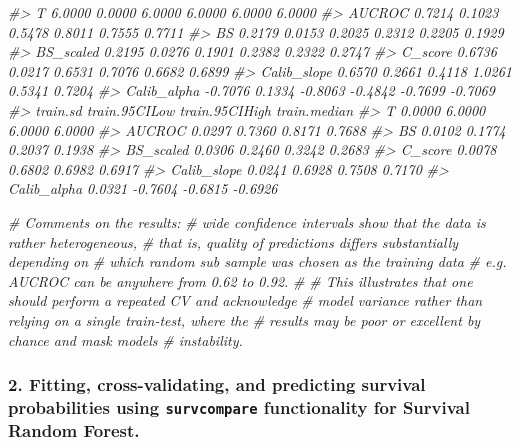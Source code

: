 \documentclass[
]{article}
\newenvironment{Shaded}{\begin{snugshade}}{\end{snugshade}}
\newcommand{\CommentTok}[1]{\textcolor[rgb]{0.56,0.35,0.01}{\textit{#1}}}
\begin{document}
\begin{Shaded}
\begin{Highlighting}[]
\CommentTok{\#\textgreater{} T              6.0000  0.0000       6.0000        6.0000      6.0000     6.0000}
\CommentTok{\#\textgreater{} AUCROC         0.7214  0.1023       0.5478        0.8011      0.7555     0.7711}
\CommentTok{\#\textgreater{} BS             0.2179  0.0153       0.2025        0.2312      0.2205     0.1929}
\CommentTok{\#\textgreater{} BS\_scaled      0.2195  0.0276       0.1901        0.2382      0.2322     0.2747}
\CommentTok{\#\textgreater{} C\_score        0.6736  0.0217       0.6531        0.7076      0.6682     0.6899}
\CommentTok{\#\textgreater{} Calib\_slope    0.6570  0.2661       0.4118        1.0261      0.5341     0.7204}
\CommentTok{\#\textgreater{} Calib\_alpha   {-}0.7076  0.1334      {-}0.8063       {-}0.4842     {-}0.7699    {-}0.7069}
\CommentTok{\#\textgreater{}             train.sd train.95CILow train.95CIHigh train.median}
\CommentTok{\#\textgreater{} T             0.0000        6.0000         6.0000       6.0000}
\CommentTok{\#\textgreater{} AUCROC        0.0297        0.7360         0.8171       0.7688}
\CommentTok{\#\textgreater{} BS            0.0102        0.1774         0.2037       0.1938}
\CommentTok{\#\textgreater{} BS\_scaled     0.0306        0.2460         0.3242       0.2683}
\CommentTok{\#\textgreater{} C\_score       0.0078        0.6802         0.6982       0.6917}
\CommentTok{\#\textgreater{} Calib\_slope   0.0241        0.6928         0.7508       0.7170}
\CommentTok{\#\textgreater{} Calib\_alpha   0.0321       {-}0.7604        {-}0.6815      {-}0.6926}

\CommentTok{\# Comments on the results: }
\CommentTok{\# wide confidence intervals show that the data is rather heterogeneous, }
\CommentTok{\# that is, quality of predictions differs substantially depending on }
\CommentTok{\# which random sub sample was chosen as the training data}
\CommentTok{\# e.g. AUCROC can be anywhere from 0.62 to 0.92.}
\CommentTok{\# }
\CommentTok{\# This illustrates that one should perform a repeated CV and acknowledge}
\CommentTok{\# model variance rather than relying on a single train{-}test, where the}
\CommentTok{\# results may be poor or excellent by chance and mask model\textquotesingle{}s}
\CommentTok{\# instability. }
\end{Highlighting}
\end{Shaded}

\hypertarget{fitting-cross-validating-and-predicting-survival-probabilities-using-survcompare-functionality-for-survival-random-forest.}{%
\subsubsection{\texorpdfstring{2. Fitting, cross-validating, and
predicting survival probabilities using \texttt{survcompare}
functionality for Survival Random
Forest.}{2. Fitting, cross-validating, and predicting survival probabilities using survcompare functionality for Survival Random Forest.}}\label{fitting-cross-validating-and-predicting-survival-probabilities-using-survcompare-functionality-for-survival-random-forest.}}
\end{document}
